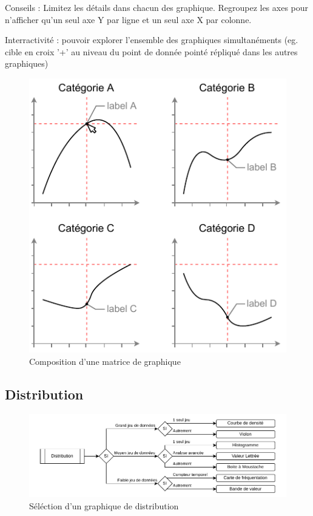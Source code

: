 \documentclass[a4paper,12pt]{article}
\begin{document}
\begin{multicols}{2}
Conseils : Limitez les détails dans chacun des graphique. \autocite{sosulskiGraphics2019} Regroupez les axes pour n'afficher qu'un seul axe Y par ligne et un seul axe X par colonne.

Interractivité : pouvoir explorer l'ensemble des graphiques simultanéments (eg. cible en croix '+' au niveau du point de donnée pointé répliqué dans les autres graphiques)

\begin{figure}[H]
\centering
\includegraphics[width=.9\linewidth]{./img/small-multiple.pdf}
\caption{\label{fig:Compo-small-multiple}Composition d'une matrice de graphique}
\end{figure}
\subsection*{Distribution}
\label{sec:org2a6221f}

\begin{figure}
\centering
\includegraphics[width=.9\linewidth]{./img/select-distribution.pdf}
\caption{\label{fig:select-distribution}Séléction d'un graphique de distribution}
\end{figure}

\end{multicols}
\end{document}
